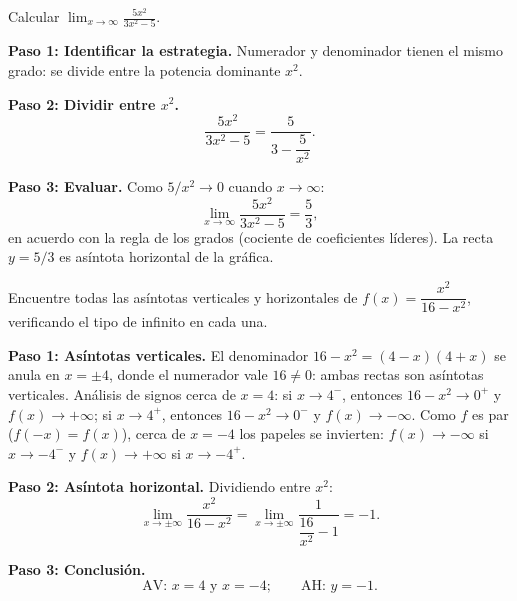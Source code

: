 \begin{example}
Calcular $\displaystyle\lim_{x\to\infty}\frac{5x^2}{3x^2-5}$.

\begin{myproof}
\textbf{Paso 1: Identificar la estrategia.} Numerador y denominador tienen
el mismo grado: se divide entre la potencia dominante $x^2$.

\textbf{Paso 2: Dividir entre $x^2$.}
\[
  \frac{5x^2}{3x^2-5} = \frac{5}{3-\dfrac{5}{x^2}}.
\]

\textbf{Paso 3: Evaluar.} Como $5/x^2\to 0$ cuando $x\to\infty$:
\[
  \boxed{\lim_{x\to\infty}\frac{5x^2}{3x^2-5} = \frac{5}{3},}
\]
en acuerdo con la regla de los grados (cociente de coeficientes líderes).
La recta $y=5/3$ es asíntota horizontal de la gráfica.
\end{myproof}
\end{example}

\begin{example}
Encuentre todas las asíntotas verticales y horizontales de
$f(x)=\dfrac{x^2}{16-x^2}$, verificando el tipo de infinito en cada una.

\begin{myproof}
\textbf{Paso 1: Asíntotas verticales.} El denominador $16-x^2=(4-x)(4+x)$
se anula en $x=\pm 4$, donde el numerador vale $16\neq 0$: ambas rectas son
asíntotas verticales. Análisis de signos cerca de $x=4$: si $x\to 4^-$,
entonces $16-x^2\to 0^+$ y $f(x)\to +\infty$; si $x\to 4^+$, entonces
$16-x^2\to 0^-$ y $f(x)\to -\infty$. Como $f$ es par ($f(-x)=f(x)$), cerca
de $x=-4$ los papeles se invierten: $f(x)\to -\infty$ si $x\to -4^-$ y
$f(x)\to +\infty$ si $x\to -4^+$.

\textbf{Paso 2: Asíntota horizontal.} Dividiendo entre $x^2$:
\[
  \lim_{x\to\pm\infty}\frac{x^2}{16-x^2}
  = \lim_{x\to\pm\infty}\frac{1}{\dfrac{16}{x^2}-1} = -1.
\]

\textbf{Paso 3: Conclusión.}
\[
  \boxed{\text{AV: } x=4 \text{ y } x=-4; \qquad \text{AH: } y=-1.}
\]
\end{myproof}
\end{example}

